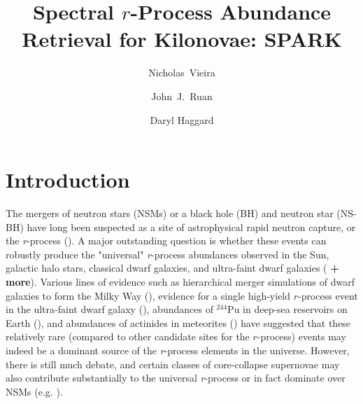 \documentclass[twocolumn]{aastex63}
\begin{document}
\title{Spectral $r$-Process Abundance Retrieval for Kilonovae: \textsc{SPARK}}


\author[0000-0001-7815-7604]{Nicholas~Vieira}

\author[0000-0001-8665-5523]{John~J.~Ruan}

\author[0000-0001-6803-2138]{Daryl Haggard}


\begin{abstract}
\end{abstract}


\section{Introduction}\label{sec:intro}
The mergers of neutron stars (NSMs) or a black hole (BH) and neutron star (NS-BH) have long been suspected as a site of astrophysical rapid neutron capture, or the \textit{r}-process (\citealt{lattimer74, eichler89, freiburghaus99}). A major outstanding question is whether these events can robustly produce the "universal" \textit{r}-process abundances observed in the Sun, galactic halo stars, classical dwarf galaxies, and ultra-faint dwarf galaxies (\citealt{sneden08, ji16, cote18} \textbf{+ more}). Various lines of evidence such as hierarchical merger simulations of dwarf galaxies to form the Milky Way (\citealt{ishimaru15}), evidence for a single high-yield $r$-process event in the ultra-faint dwarf galaxy  (\citealt{ji16, roederer16}), abundances of $^{244}$Pu in deep-sea reservoirs on Earth (\citealt{wallner15}), and abundances of actinides in meteorites (\citealt{bartos19}) have suggested that these relatively rare (compared to other candidate sites for the $r$-process) events may indeed be a dominant source of the \textit{r}-process elements in the universe. However, there is still much debate, and certain classes of core-collapse supernovae may also contribute substantially to the universal \textit{r}-process or in fact dominate over NSMs (e.g. \citealt{siegel19}).
\end{document}
